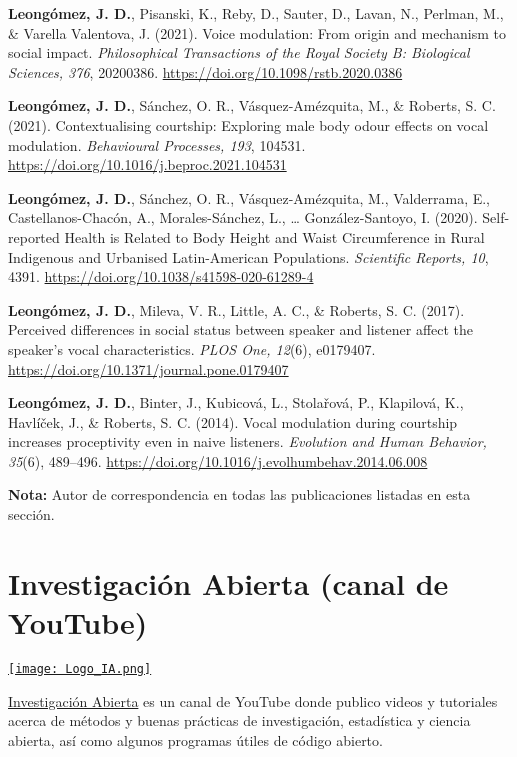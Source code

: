 \documentclass[11pt,a4paper,]{awesome-cv}
\begin{document}
\textbf{Leongómez, J. D.}, Pisanski, K., Reby, D., Sauter, D., Lavan,
N., Perlman, M., \& Varella Valentova, J. (2021). Voice modulation: From
origin and mechanism to social impact. \emph{Philosophical Transactions
of the Royal Society B: Biological Sciences, 376}, 20200386.
\url{https://doi.org/10.1098/rstb.2020.0386}

\textbf{Leongómez, J. D.}, Sánchez, O. R., Vásquez-Amézquita, M., \&
Roberts, S. C. (2021). Contextualising courtship: Exploring male body
odour effects on vocal modulation. \emph{Behavioural Processes, 193},
104531. \url{https://doi.org/10.1016/j.beproc.2021.104531}

\textbf{Leongómez, J. D.}, Sánchez, O. R., Vásquez-Amézquita, M.,
Valderrama, E., Castellanos-Chacón, A., Morales-Sánchez, L., \ldots{}
González-Santoyo, I. (2020). Self-reported Health is Related to Body
Height and Waist Circumference in Rural Indigenous and Urbanised
Latin-American Populations. \emph{Scientific Reports, 10}, 4391.
\url{https://doi.org/10.1038/s41598-020-61289-4}

\textbf{Leongómez, J. D.}, Mileva, V. R., Little, A. C., \& Roberts, S.
C. (2017). Perceived differences in social status between speaker and
listener affect the speaker's vocal characteristics. \emph{PLOS One,
12}(6), e0179407. \url{https://doi.org/10.1371/journal.pone.0179407}

\textbf{Leongómez, J. D.}, Binter, J., Kubicová, L., Stolařová, P.,
Klapilová, K., Havlíček, J., \& Roberts, S. C. (2014). Vocal modulation
during courtship increases proceptivity even in naive listeners.
\emph{Evolution and Human Behavior, 35}(6), 489--496.
\url{https://doi.org/10.1016/j.evolhumbehav.2014.06.008}

\endgroup

\begin{footnotesize}
\textbf{Nota:} Autor de correspondencia en todas las publicaciones listadas en esta sección.
\end{footnotesize}

\hypertarget{investigaciuxf3n-abierta-canal-de-youtube}{%
\section{Investigación Abierta (canal de
YouTube)}\label{investigaciuxf3n-abierta-canal-de-youtube}}

\begin{minipage}[c]{0.15\linewidth}
\href{https://www.youtube.com/@InvestigacionAbierta}{\texttt{[image: Logo\_IA.png]}}
\end{minipage} \begin{minipage}[c]{0.85\linewidth}
\textcolor{red}{\faYoutube} \href{https://www.youtube.com/@InvestigacionAbierta}{Investigación Abierta} es un canal de YouTube donde publico videos y tutoriales acerca de métodos y buenas prácticas de investigación, estadística y ciencia abierta, así como algunos programas útiles de código abierto.
\end{minipage}
\end{document}
